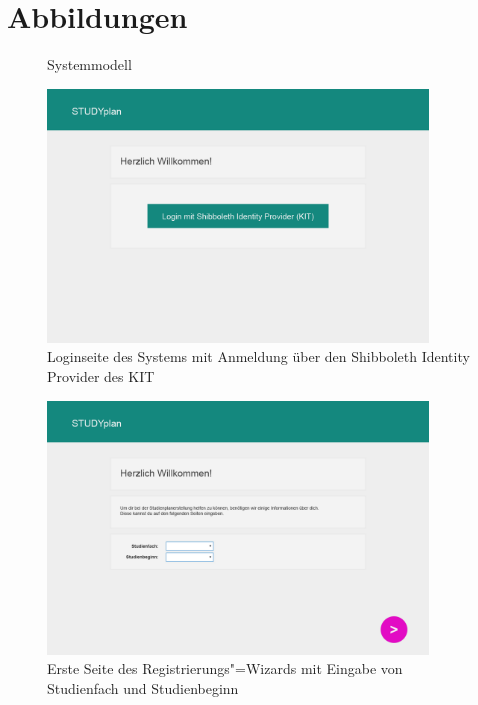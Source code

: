 \FloatBarrier
\section{Abbildungen}
\begin{figure}[!h]
	\caption{Systemmodell}
	\label{system_model:overview}
	\resizebox{\textwidth}{!} {
		
	}
\end{figure}
\begin{figure}[!h]
	\caption{Loginseite des Systems mit Anmeldung über den \gls{Shibboleth Identity Provider} des \gls{KIT}}
	\label{fig:gui-login-1}
	\centering
	\includegraphics[width=0.9\textwidth]{../GUI/ergebnisse/login-1.png}
\end{figure}
\begin{figure}[!h]
	\caption{Erste Seite des Registrierungs"=\gls{Wizard}s mit Eingabe von Studienfach und Studienbeginn}
	\label{fig:gui-registrierung-1}
	\centering
	\includegraphics[width=0.9\textwidth]{../GUI/ergebnisse/registrierung-1.png}
\end{figure}

